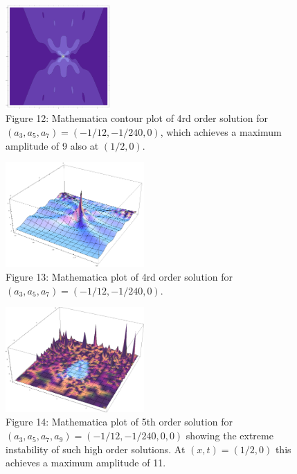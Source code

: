 \documentclass{beamer}
\theoremstyle{plain}
\theoremstyle{definition}
\begin{document}
\frame
{
\begin{figure}
\begin{center}
\includegraphics[width=150px]{4th_order_max_peak_contour.png}\\
Figure 12: Mathematica contour plot of 4rd order solution for $(a_3,a_5,a_7)=(-1/12,-1/240,0)$, which achieves a maximum amplitude of 9 also at $(1/2,0)$. 
\end{center}
\end{figure}
\vspace{-1mm}
}

\frame
{
\begin{figure}
\begin{center}
\includegraphics[width=200px]{4th_order_max_peak.png}\\
Figure 13: Mathematica plot of 4rd order solution for $(a_3,a_5,a_7)=(-1/12,-1/240,0)$.
\end{center}
\end{figure}
\vspace{-1mm}
}

\frame
{
\begin{figure}
\begin{center}
\includegraphics[width=200px]{5th_order_unstable.png}\\
Figure 14: Mathematica plot of 5th order solution for $(a_3,a_5,a_7,a_9)=(-1/12,-1/240,0,0)$ showing the extreme instability of such high order solutions. At $(x,t)=(1/2,0)$ this achieves a maximum amplitude of 11.
\end{center}
\end{figure}
\vspace{-1mm}
}
\end{document}

